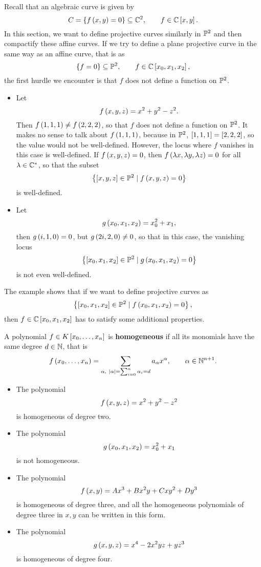 
Recall that an algebraic curve is given by
$$ C = \cb{f\rb{x, y} = 0} \subseteq \C^2, \qquad f \in \C\sb{x, y}. $$
In this section, we want to define projective curves similarly in $ \P^2 $ and then compactify these affine curves. If we try to define a plane projective curve in the same way as an affine curve, that is as
$$ \cb{f = 0} \subseteq \P^2, \qquad f \in \C\sb{x_0, x_1, x_2}, $$
the first hurdle we encounter is that $ f $ does not define a function on $ \P^2 $.

\begin{example}
\hfill
\begin{itemize}
\item Let
$$ f\rb{x, y, z} = x^2 + y^2 - z^2. $$
Then $ f\rb{1, 1, 1} \ne f\rb{2, 2, 2} $, so that $ f $ does not define a function on $ \P^2 $. It makes no sense to talk about $ f\rb{1, 1, 1} $, because in $ \P^2 $, $ \sb{1, 1, 1} = \sb{2, 2, 2} $, so the value would not be well-defined. However, the locus where $ f $ vanishes in this case is well-defined. If $ f\rb{x, y, z} = 0 $, then $ f\rb{\lambda x, \lambda y, \lambda z} = 0 $ for all $ \lambda \in \C^* $, so that the subset
$$ \cb{\sb{x, y, z} \in \P^2 \mid f\rb{x, y, z} = 0} $$
is well-defined.
\item Let
$$ g\rb{x_0, x_1, x_2} = x_0^2 + x_1, $$
then $ g\rb{i, 1, 0} = 0 $, but $ g\rb{2i, 2, 0} \ne 0 $, so that in this case, the vanishing locus
$$ \cb{\sb{x_0, x_1, x_2} \in \P^2 \mid g\rb{x_0, x_1, x_2} = 0} $$
is not even well-defined.
\end{itemize}
\end{example}

The example shows that if we want to define projective curves as
$$ \cb{\sb{x_0, x_1, x_2} \in \P^2 \mid f\rb{x_0, x_1, x_2} = 0}, $$
then $ f \in \C\sb{x_0, x_1, x_2} $ has to satisfy some additional properties.

\begin{definition}
A polynomial $ f \in K\sb{x_0, \dots, x_n} $ is \textbf{homogeneous} if all its monomials have the same degree $ d \in \N $, that is
$$ f\rb{x_0, \dots, x_n} = \sum_{\alpha, \ \abs{\alpha} = \sum_{i = 0}^n \alpha_i = d} a_\alpha x^\alpha, \qquad \alpha \in \N^{n + 1}. $$
\end{definition}

\begin{example}
\hfill
\begin{itemize}
\item The polynomial
$$ f\rb{x, y, z} = x^2 + y^2 - z^2 $$
is homogeneous of degree two.
\item The polynomial
$$ g\rb{x_0, x_1, x_2} = x_0^2 + x_1 $$
is not homogeneous.
\item The polynomial
$$ f\rb{x, y} = Ax^3 + Bx^2y + Cxy^2 + Dy^3 $$
is homogeneous of degree three, and all the homogeneous polynomials of degree three in $ x, y $ can be written in this form.
\item The polynomial
$$ g\rb{x, y, z} = x^4 - 2x^2yz + yz^3 $$
is homogeneous of degree four.
\end{itemize}
\end{example}

